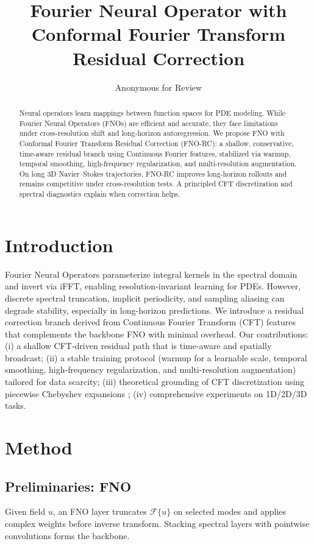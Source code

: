 \documentclass[11pt,twocolumn]{article}
\title{Fourier Neural Operator with Conformal Fourier Transform Residual Correction}
\author{Anonymous for Review}
\date{\vspace{-1em}}
\newcommand{\F}{\mathcal{F}}
\begin{document}
\maketitle

\begin{abstract}
Neural operators learn mappings between function spaces for PDE modeling. While Fourier Neural Operators (FNOs) are efficient and accurate, they face limitations under cross-resolution shift and long-horizon autoregression. We propose FNO with Conformal Fourier Transform Residual Correction (FNO-RC): a shallow, conservative, time-aware residual branch using Continuous Fourier features, stabilized via warmup, temporal smoothing, high-frequency regularization, and multi-resolution augmentation. On long 3D Navier--Stokes trajectories, FNO-RC improves long-horizon rollouts and remains competitive under cross-resolution tests. A principled CFT discretization and spectral diagnostics explain when correction helps.
\end{abstract}

\section{Introduction}
Fourier Neural Operators \citep{li2020fourier} parameterize integral kernels in the spectral domain and invert via iFFT, enabling resolution-invariant learning for PDEs. However, discrete spectral truncation, implicit periodicity, and sampling aliasing can degrade stability, especially in long-horizon predictions. We introduce a residual correction branch derived from Continuous Fourier Transform (CFT) features that complements the backbone FNO with minimal overhead. Our contributions: (i) a shallow CFT-driven residual path that is time-aware and spatially broadcast; (ii) a stable training protocol (warmup for a learnable scale, temporal smoothing, high-frequency regularization, and multi-resolution augmentation) tailored for data scarcity; (iii) theoretical grounding of CFT discretization using piecewise Chebyshev expansions \citep{barnett2010conformal}; (iv) comprehensive experiments on 1D/2D/3D tasks.

\section{Method}
\subsection{Preliminaries: FNO}
Given field $u$, an FNO layer truncates $\F\{u\}$ on selected modes and applies complex weights before inverse transform. Stacking spectral layers with pointwise convolutions forms the backbone.
\end{document}

